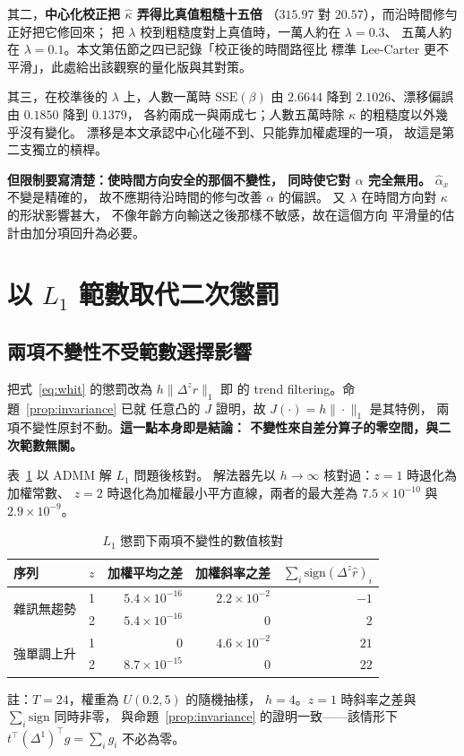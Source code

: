 \documentclass[UTF8, fontset=macnew, a4paper, 12pt]{ctexart}
\begin{document}
其二，\textbf{中心化校正把 $\hat\kappa$ 弄得比真值粗糙十五倍}
（$315.97$ 對 $20.57$），而沿時間修勻正好把它修回來；
把 $\lambda$ 校到粗糙度對上真值時，一萬人約在 $\lambda=0.3$、
五萬人約在 $\lambda=0.1$。本文第伍節之四已記錄「校正後的時間路徑比
標準 Lee-Carter 更不平滑」，此處給出該觀察的量化版與其對策。

其三，在校準後的 $\lambda$ 上，人數一萬時 $\mathrm{SSE}(\beta)$ 由
$2.6644$ 降到 $2.1026$、漂移偏誤由 $0.1850$ 降到 $0.1379$，
各約兩成一與兩成七；人數五萬時除 $\kappa$ 的粗糙度以外幾乎沒有變化。
漂移是本文承認中心化碰不到、只能靠加權處理的一項，
故這是第二支獨立的槓桿。

\textbf{但限制要寫清楚：使時間方向安全的那個不變性， 同時使它對 $\alpha$ 完全無用。} $\hat\alpha_x$ 不變是精確的，
故不應期待沿時間的修勻改善 $\alpha$ 的偏誤。
又 $\lambda$ 在時間方向對 $\kappa$ 的形狀影響甚大，
不像年齡方向輸送之後那樣不敏感，故在這個方向
平滑量的估計由加分項回升為必要。

\section{以 $L_1$ 範數取代二次懲罰}\label{sec:l1}

\subsection{兩項不變性不受範數選擇影響}\label{subsec:l1-inv}

把式~\eqref{eq:whit} 的懲罰改為 $h\|\Delta^{z}r\|_1$ 即
\citet{kim2009} 的 trend filtering。命題~\ref{prop:invariance} 已就
任意凸的 $J$ 證明，故 $J(\cdot)=h\|\cdot\|_1$ 是其特例，
兩項不變性原封不動。\textbf{這一點本身即是結論： 不變性來自差分算子的零空間，與二次範數無關。}

表~\ref{tab:l1inv} 以 ADMM 解 $L_1$ 問題後核對。
解法器先以 $h\to\infty$ 核對過：$z=1$ 時退化為加權常數、
$z=2$ 時退化為加權最小平方直線，兩者的最大差為
$7.5\times10^{-10}$ 與$2.9\times10^{-9}$。

\begin{table}[H]
\centering
\caption{$L_1$ 懲罰下兩項不變性的數值核對}
\small
\renewcommand{\arraystretch}{1.1}
\begin{tabular}{llrrr}
\toprule
序列 & $z$ & 加權平均之差 & 加權斜率之差 & $\textstyle\sum_i\mathrm{sign}(\Delta^z\hat r)_i$\\
\midrule
\multirow{2}{*}{雜訊無趨勢}
 & 1 & $5.4\times10^{-16}$ & $2.2\times10^{-2}$ & $-1$\\
 & 2 & $5.4\times10^{-16}$ & $0$ & $2$\\
\midrule
\multirow{2}{*}{強單調上升}
 & 1 & $0$ & $4.6\times10^{-2}$ & $21$\\
 & 2 & $8.7\times10^{-15}$ & $0$ & $22$\\
\bottomrule
\end{tabular}

\vspace{2pt}
\parbox{0.92\textwidth}{\footnotesize 註：$T=24$，權重為 $U(0.2,5)$ 的隨機抽樣，
$h=4$。$z=1$ 時斜率之差與 $\sum_i\mathrm{sign}$ 同時非零，
與命題~\ref{prop:invariance} 的證明一致——該情形下
$t^{\top}(\Delta^{1})^{\top}g=\sum_i g_i$ 不必為零。}
\label{tab:l1inv}
\end{table}
\end{document}
